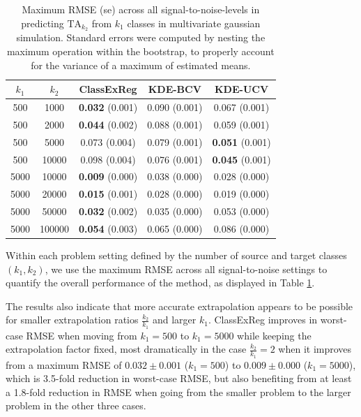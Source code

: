 \documentclass[twoside,11pt]{article}
\begin{document}
\begin{table}
\centering
\begin{tabular}{cc||c|c|c}
\hline
$k_1$ & $k_2$ & ClassExReg & KDE-BCV & KDE-UCV \\\hline 
500 & 1000 & \textbf{0.032} (0.001) & 0.090 (0.001) & 0.067 (0.001) \\
500 & 2000 & \textbf{0.044} (0.002) & 0.088 (0.001) & 0.059 (0.001) \\
500 & 5000 & 0.073 (0.004) & 0.079 (0.001) & \textbf{0.051} (0.001) \\
500 &10000 & 0.098 (0.004) & 0.076 (0.001) & \textbf{0.045} (0.001) \\\hline
5000 & 10000 & \textbf{0.009} (0.000) & 0.038 (0.000) & 0.028 (0.000) \\
5000 & 20000 & \textbf{0.015} (0.001) & 0.028 (0.000) & 0.019 (0.000) \\
5000 & 50000 & \textbf{0.032} (0.002) & 0.035 (0.000) & 0.053 (0.000) \\
5000 &100000 & \textbf{0.054} (0.003) & 0.065 (0.000) & 0.086 (0.000) \\\hline
\end{tabular}
\caption{Maximum RMSE (se) across all signal-to-noise-levels in
  predicting $\text{TA}_{k_2}$ from $k_1$ classes in multivariate
  gaussian simulation.  Standard errors were computed by nesting the
  maximum operation within the bootstrap, to properly account for the variance of a maximum of estimated means.}\label{tab:sim_max_error}
\end{table}

Within each problem setting defined by the number of
source and target classes $(k_1,k_2)$, we use the maximum RMSE across
all signal-to-noise settings to quantify the overall performance of
the method, as displayed in Table \ref{tab:sim_max_error}.

The results also indicate that more accurate extrapolation
appears to be possible for smaller extrapolation ratios
$\frac{k_2}{k_1}$ and larger $k_1$.
ClassExReg improves in worst-case RMSE when moving from $k_1 =500$ to $k_1 = 5000$ while keeping the extrapolation factor fixed, most dramatically in the case $\frac{k_2}{k_1} = 2$ when it improves from a
maximum RMSE of $0.032\pm0.001$ ($k_1 = 500$) to $0.009 \pm 0.000$ ($k_1 = 5000$), which is 3.5-fold reduction in worst-case RMSE, but
also benefiting from at least a 1.8-fold reduction in RMSE when going from
the smaller problem to the larger problem in the other three cases.
\end{document}
